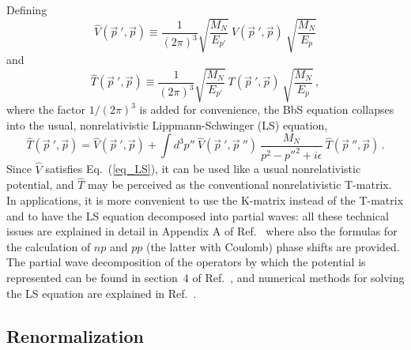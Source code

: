 \documentclass[sort&compress,preprint,3p]{elsarticle}
\begin{document}
Defining
\begin{equation}
\widehat{V}({\vec p}~',{\vec p})
\equiv 
\frac{1}{(2\pi)^3}
\sqrt{\frac{M_N}{E_{p'}}}\:  
{V}({\vec p}~',{\vec p})\:
 \sqrt{\frac{M_N}{E_{p}}}
\label{eq_minrel1}
\end{equation}
and
\begin{equation}
\widehat{T}({\vec p}~',{\vec p})
\equiv 
\frac{1}{(2\pi)^3}
\sqrt{\frac{M_N}{E_{p'}}}\:  
{T}({\vec p}~',{\vec p})\:
 \sqrt{\frac{M_N}{E_{p}}}
\,,
\label{eq_minrel2}
\end{equation}
where the factor $1/(2\pi)^3$ is added for convenience,
the BbS equation collapses into the usual, nonrelativistic
Lippmann-Schwinger (LS) equation,
\begin{equation}
 \widehat{T}({\vec p}~',{\vec p})= \widehat{V}({\vec p}~',{\vec p})+
\int d^3p''\:
\widehat{V}({\vec p}~',{\vec p}~'')\:
\frac{M_N}
{{ p}^{2}-{p''}^{2}+i\epsilon}\:
\widehat{T}({\vec p}~'',{\vec p}) \, .
\label{eq_LS}
\end{equation}
Since 
$\widehat V$ 
satisfies Eq.~(\ref{eq_LS}), 
it can be used like a usual nonrelativistic potential, and 
$\widehat{T}$ 
may be perceived as the conventional nonrelativistic 
T-matrix.
In applications, it is more convenient to use the K-matrix instead
of the T-matrix and to have the LS equation
decomposed into partial waves: all these technical issues
are explained in detail in Appendix A of Ref.~\cite{Mac01} where also 
the formulas for the calculation of $np$ and $pp$ (the latter with Coulomb) phase shifts
are provided.
The partial wave decomposition of the operators by which the potential
is represented can be found in section~4 of Ref.~\cite{EAH71}, and numerical methods
for solving the LS equation are explained in Ref.~\cite{Mac93}.



\subsection{Renormalization}
\label{sec_reno}
\end{document}
